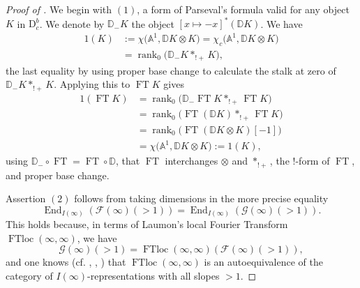 \begin{proof}[Proof of \chthreethmthreezerofour]
We begin with \((1)\), a form of Parseval's formula valid for any object
\(K\) in \(\mathrm{D}^b_c\). We denote by \(\mathbb{D}_{-}K\) the object
\([x\mapsto -x]^*(\mathbb{D}K)\). We have
\[
\begin{aligned}
  1(K)
  &:=\chi\bigl(\mathbb{A}^1,\mathbb{D}K\otimes K\bigr)
   = \chi_c\bigl(\mathbb{A}^1,\mathbb{D}K\otimes K\bigr) \\
  &=\operatorname{rank}_0\bigl(\mathbb{D}_{-}K*_{!+}K\bigr),
\end{aligned}
\]
the last equality by using proper base change to calculate the stalk at zero
of \(\mathbb{D}_{-}K*_{!+}K\). Applying this to \(\operatorname{FT}K\) gives
\[
\begin{aligned}
  1(\operatorname{FT}K)
  &= \operatorname{rank}_0
     \bigl(\mathbb{D}_{-}\operatorname{FT}K*_{!+}\operatorname{FT}K\bigr) \\
  &= \operatorname{rank}_0
     \bigl(\operatorname{FT}(\mathbb{D}K)*_{!+}\operatorname{FT}K\bigr) \\
  &= \operatorname{rank}_0
     \bigl(\operatorname{FT}(\mathbb{D}K\otimes K)[-1]\bigr) \\
  &= \chi\bigl(\mathbb{A}^1,\mathbb{D}K\otimes K\bigr)
   := 1(K),
\end{aligned}
\]
using \(\mathbb{D}_{-}\circ\operatorname{FT}=\operatorname{FT}\circ
\mathbb{D}\), that \(\operatorname{FT}\) interchanges \(\otimes\) and
\(*_{!+}\), the \(!\)-form of \(\operatorname{FT}\), and proper base change.

Assertion \((2)\) follows from taking dimensions in the more precise equality
\[
  \operatorname{End}_{I(\infty)}(\mathcal{F}(\infty)(>1))
  =
  \operatorname{End}_{I(\infty)}(\mathcal{G}(\infty)(>1)).
\]
This holds because, in terms of Laumon's local Fourier Transform
\(\operatorname{FTloc}(\infty,\infty)\), we have
\[
  \mathcal{G}(\infty)(>1)
  =
  \operatorname{FTloc}(\infty,\infty)(\mathcal{F}(\infty)(>1)),
\]
and one knows (cf. \cite{Lau-TF}, \cite{Ka-TL},
\cite[7.4.1]{Ka-ESDE}) that \(\operatorname{FTloc}(\infty,\infty)\) is an
autoequivalence of the category of \(I(\infty)\)-representations with all
slopes \(>1\).


\end{proof}
